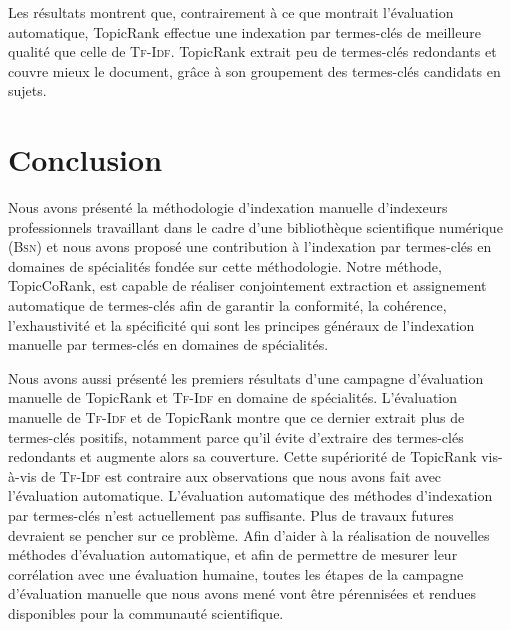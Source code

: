       Les résultats montrent que, contrairement à ce que montrait l'évaluation
      automatique, TopicRank effectue une indexation par termes-clés de
      meilleure qualité que celle de \textsc{Tf-Idf}. TopicRank extrait peu de
      termes-clés redondants et couvre mieux le document, grâce à son groupement
      des termes-clés candidats en sujets.


  \section{Conclusion}
  \label{sec:main-domain_specific_keyphrase_annotation-conclusion}
    Nous avons présenté la méthodologie d'indexation manuelle d'indexeurs
    professionnels travaillant dans le cadre d'une bibliothèque scientifique
    numérique (\textsc{Bsn}) et nous avons proposé une contribution à
    l'indexation par termes-clés en domaines de spécialités fondée sur cette
    méthodologie. Notre méthode, TopicCoRank, est capable de réaliser
    conjointement extraction et assignement automatique de termes-clés afin de
    garantir la conformité, la cohérence, l'exhaustivité et la spécificité qui
    sont les principes généraux de l'indexation manuelle par termes-clés en
    domaines de spécialités.

    Nous avons aussi présenté les premiers résultats d'une campagne d'évaluation
    manuelle de TopicRank et \textsc{Tf-Idf} en domaine de spécialités.
    L'évaluation manuelle de \textsc{Tf-Idf} et de TopicRank montre que ce
    dernier extrait plus de termes-clés positifs, notamment parce qu'il évite
    d'extraire des termes-clés redondants et augmente alors sa couverture. Cette
    supériorité de TopicRank vis-à-vis de \textsc{Tf-Idf} est contraire aux
    observations que nous avons fait avec l'évaluation automatique. L'évaluation
    automatique des méthodes d'indexation par termes-clés n'est actuellement pas
    suffisante. Plus de travaux futures devraient se pencher sur ce problème.
    Afin d'aider à la réalisation de nouvelles méthodes d'évaluation
    automatique, et afin de permettre de mesurer leur corrélation avec une
    évaluation humaine, toutes les étapes de la campagne d'évaluation manuelle
    que nous avons mené vont être pérennisées et rendues disponibles pour la
    communauté scientifique.

